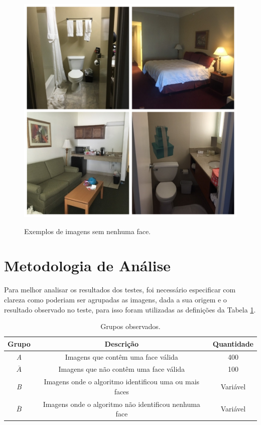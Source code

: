 \begin{figure}[htbp]
    \centering
    \caption{Exemplos de imagens sem nenhuma face.}
    \includegraphics[scale=.25]{figs/hotels.jpg}
    \label{fig:hotel-examples}
\end{figure}

\section{Metodologia de Análise}

Para melhor analisar os resultados dos testes, foi necessário especificar com clareza como poderiam ser agrupadas as imagens, dada a sua origem e o resultado observado no teste, para isso foram utilizadas as definições da Tabela \ref{tab:grupos-images}.

\begin{table}[htbp]
    \caption{Grupos observados.}
    \label{tab:grupos-images}
    \centering
    \begin{tabular}{ccc}\hline\hline
        \textbf{Grupo} & \textbf{Descrição}                                     & \textbf{Quantidade} \\\hline
        \textit{A}     & Imagens que contêm uma face válida                     & 400                 \\
        $\overline{A}$ & Imagens que não contêm uma face válida                 & 100                 \\
        \textit{B}     & Imagens onde o algoritmo identificou uma ou mais faces & Variável            \\
        $\overline{B}$ & Imagens onde o algoritmo não identificou nenhuma face  & Variável            \\
        \hline\hline
    \end{tabular}
\end{table}

